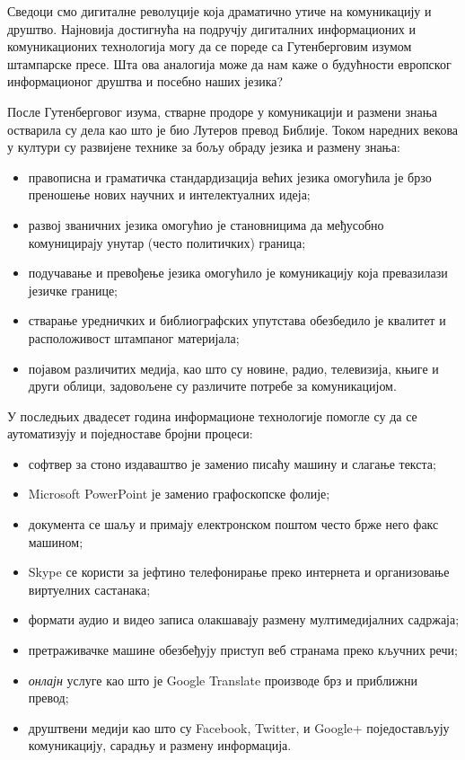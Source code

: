 \begin{multicols}{2}


Сведоци смо дигиталне револуције која драматично утиче на комуникацију и друштво. Најновија достигнућа на подручју дигиталних информационих и комуникационих технологија могу да се пореде са Гутенберговим изумом штампарске пресе. Шта ова аналогија може да нам каже о будућности европског информационог друштва и посебно наших језика?




После Гутенберговог изума, стварне продоре у комуникацији и размени знања остварила су дела као што је био Лутеров превод Библије. Током наредних векова у култури су развијене технике за бољу обраду језика и размену знања:

\begin{itemize}
 \item правописна и граматичка стандардизација већих језика омогућила је брзо преношење нових научних и интелектуалних идеја;
 \item развој званичних језика омогућио је становницима да међусобно комуницирају унутар (често политичких) граница;
 \item подучавање и превођење језика омогућило је комуникацију која превазилази језичке границе;
 \item стварање уредничких и библиографских упутстава обезбедило је квалитет и расположивост штампаног материјала;
 \item појавом различитих медија, као што су новине, радио, телевизија, књиге и други облици, задовољене су различите  потребе за комуникацијом. 
\end{itemize}

У последњих двадесет година информационе технологије помогле су да се аутоматизују и поједноставе бројни процеси:

\begin{itemize}
\item софтвер за стоно издаваштво је заменио писаћу машину и слагање текста;
\item Microsoft PowerPoint је заменио графоскопске фолије;
\item документа се шаљу и примају електронском поштом често брже него факс машином;
\item Skype се користи за јефтино телефонирање преко интернета и организовање виртуелних састанака;
\item формати аудио и видео записа олакшавају размену мултимедијалних садржаја;
\item претраживачке машине обезбеђују приступ веб странама преко кључних речи;
\item \textit{онлајн} услуге као што је Google Translate производе брз и  приближни превод;
\item друштвени медији као што су Facebook, Twitter, и Google+ поједостављују  комуникацију, сарадњу и размену информација.
\end{itemize}


\end{multicols}
